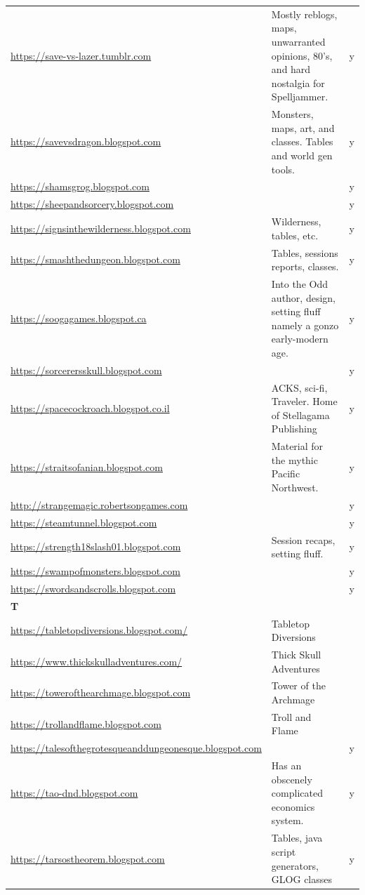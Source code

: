 \documentclass[a4paper, 11pt, twoside]{article}
\begin{document}
\begin{longtable}{p{6cm}p{8cm}c}
\url{https://save-vs-lazer.tumblr.com} & Mostly reblogs, maps, unwarranted opinions, 80's, and hard nostalgia for Spelljammer. & y\\
\url{https://savevsdragon.blogspot.com} & Monsters, maps, art, and classes. Tables and world gen tools. & y\\
\url{https://shamsgrog.blogspot.com} &  & y\\
\url{https://sheepandsorcery.blogspot.com} &  & y\\
\url{https://signsinthewilderness.blogspot.com} & Wilderness, tables, etc. & y\\
\url{https://smashthedungeon.blogspot.com} & Tables, sessions reports, classes. & y\\
\url{https://soogagames.blogspot.ca} & Into the Odd author, design, setting fluff namely a gonzo early-modern age. & y\\
\url{https://sorcerersskull.blogspot.com} &  & y\\
\url{https://spacecockroach.blogspot.co.il} & ACKS, sci-fi, Traveler. Home of Stellagama Publishing & y\\
\url{https://straitsofanian.blogspot.com} & Material for the mythic Pacific Northwest. & y\\
\url{http://strangemagic.robertsongames.com} &  & y\\
\url{https://steamtunnel.blogspot.com} &  & y\\
\url{https://strength18slash01.blogspot.com} & Session recaps, setting fluff. & y\\
\url{https://swampofmonsters.blogspot.com} &  & y\\
\url{https://swordsandscrolls.blogspot.com} &  & y\\
\textbf{T} &  & \\
\url{https://tabletopdiversions.blogspot.com/} & Tabletop Diversions & \\
\url{https://www.thickskulladventures.com/} & Thick Skull Adventures & \\
\url{https://towerofthearchmage.blogspot.com} & Tower of the Archmage & \\
\url{https://trollandflame.blogspot.com} & Troll and Flame & \\
\url{https://talesofthegrotesqueanddungeonesque.blogspot.com} &  & y\\
\url{https://tao-dnd.blogspot.com} & Has an obscenely complicated economics system. & y\\
\url{https://tarsostheorem.blogspot.com} & Tables, java script generators, GLOG classes & y\\

\end{longtable}
\end{document}
